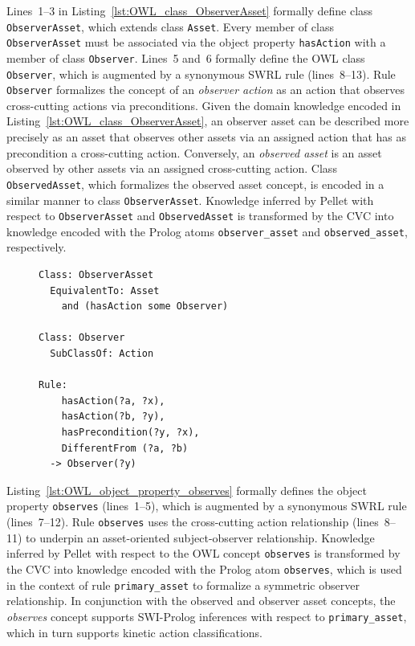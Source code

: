 Lines~1--3 in Listing~\ref{lst:OWL_class_ObserverAsset} formally define class \texttt{ObserverAsset}, which extends class \texttt{Asset}. Every member of class \texttt{ObserverAsset} must be associated via the object property \texttt{hasAction} with a member of class \texttt{Observer}. Lines~5 and~6 formally define the OWL class \texttt{Observer}, which is augmented by a synonymous SWRL rule (lines~8--13). Rule \texttt{Observer} formalizes the concept of an \emph{observer action} as an action that observes cross-cutting actions via preconditions. Given the domain knowledge encoded in Listing~\ref{lst:OWL_class_ObserverAsset}, an observer asset can be described more precisely as an asset that observes other assets via an assigned action that has as precondition a cross-cutting action. Conversely, an \emph{observed asset} is an asset observed by other assets via an assigned cross-cutting action. Class \texttt{ObservedAsset}, which formalizes the observed asset concept, is encoded in a similar manner to class \texttt{ObserverAsset}. Knowledge inferred by Pellet with respect to \texttt{ObserverAsset} and \texttt{ObservedAsset} is transformed by the CVC into knowledge encoded with the Prolog atoms \texttt{observer\_asset} and \texttt{observed\_asset}, respectively.

\begin{figure}[ht]
\begin{lstlisting}[caption={OWL+SWRL code for class \texttt{ObserverAsset}},label=lst:OWL_class_ObserverAsset]
Class: ObserverAsset
  EquivalentTo: Asset
    and (hasAction some Observer)

Class: Observer
  SubClassOf: Action

Rule:
    hasAction(?a, ?x),
    hasAction(?b, ?y),
    hasPrecondition(?y, ?x),
    DifferentFrom (?a, ?b)
  -> Observer(?y)
\end{lstlisting}
\end{figure}

Listing~\ref{lst:OWL_object_property_observes} formally defines the object property \texttt{observes} (lines~1--5), which is augmented by a synonymous SWRL rule (lines~7--12). Rule \texttt{observes} uses the cross-cutting action relationship (lines~8--11) to underpin an asset-oriented subject-observer relationship. Knowledge inferred by Pellet with respect to the OWL concept \texttt{observes} is transformed by the CVC into knowledge encoded with the Prolog atom \texttt{observes}, which is used in the context of rule \texttt{primary\_asset} to formalize a symmetric observer relationship. In conjunction with the observed and observer asset concepts, the \emph{observes} concept supports SWI-Prolog inferences with respect to \texttt{primary\_asset}, which in turn supports kinetic action classifications.

